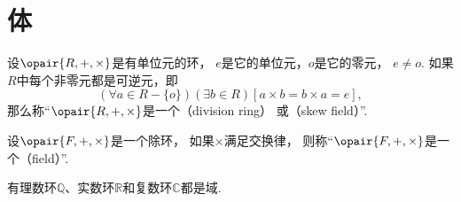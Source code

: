 \section{体}
\begin{definition}
设\(\opair{R,+,\times}\)是有单位元的环，
\(e\)是它的单位元，\(o\)是它的零元，
\(e \neq o\).
如果\(R\)中每个非零元都是可逆元，即\[
	(\forall a \in R-\{o\})(\exists b \in R)[a \times b = b \times a = e],
\]
那么称“\(\opair{R,+,\times}\)是一个（division ring）
或（skew field）”.
\end{definition}

\begin{definition}
设\(\opair{F,+,\times}\)是一个除环，
如果\(\times\)满足交换律，
则称“\(\opair{F,+,\times}\)是一个（field）”.
\end{definition}

有理数环\(\mathbb{Q}\)、实数环\(\mathbb{R}\)和复数环\(\mathbb{C}\)都是域.
